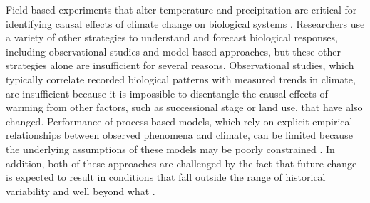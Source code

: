 \documentclass{article}
\begin{document}

\par Field-based experiments that alter temperature and precipitation are critical for identifying causal effects of climate change on biological systems \citep[e.g.,][]{box1978,williams2007,gelman2014}. Researchers use a variety of other strategies to understand and forecast biological responses, including observational studies and model-based approaches, but these other strategies alone are insufficient for several reasons. Observational studies, which typically correlate recorded biological patterns with measured trends in climate, are insufficient because it is impossible to disentangle the causal effects of warming from other factors, such as successional stage or land use, that have also changed.%
 Performance of process-based models, which rely on explicit empirical relationships between observed phenomena and climate, can be limited because the underlying assumptions of these models may be poorly constrained \citep [e.g.,][]{pearson2004,ibanez2006,swab2012}. 
In addition, both of these approaches are challenged by the fact that future change is expected to result in conditions that fall outside the range of historical variability and well beyond what  \citep{ohlemuller2006,williams2007,williams2007b,ipcc2013}.  %
\end{document}
